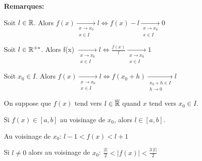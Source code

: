 \documentclass[12pt,twoside,a4paper]{article}
\begin{document}
		\begin{flushleft}
			\textbf{Remarques:}
			\begin{liste}
				\item Soit $l\in\mathbb{R}$. Alors $f(x) \mathop{\longrightarrow}\limits_{\substack{x\rightarrow x_0\\x\in I}} l \iff f(x) -l \mathop{\longrightarrow}\limits_{\substack{x\rightarrow x_0\\x\in I}} 0$
				\item Soit $l\in\mathbb{R}^{+*}$. Alors f(x) $\mathop{\longrightarrow}\limits_{\substack{x\rightarrow x_0\\x\in I}} l \iff \frac{f(x)}{l}\mathop{\longrightarrow}\limits_{\substack{x\rightarrow x_0\\x\in I}} 1$
				\item Soit $x_0\in I$. Alors $f(x)\mathop{\longrightarrow}\limits_{\substack{x\rightarrow x_0\\x\in I}} l \iff f(x_0+h)\mathop{\longrightarrow}\limits_{\substack{x_0+h\in I\\h\rightarrow 0}} l$
			\end{liste}
		\end{flushleft}
		\begin{prop}
			On suppose que $f(x)$ tend vers $l\in\overline{\mathbb{R}}$ quand $x$ tend vers $x_0\in I$.
			\begin{liste}
				\item Si $f(x)\in [a,b]$ au voisinage de $x_0$, alors $l\in [a,b]$.
				\item Au voisinage de $x_0$: $l-1<f(x)<l+1$
				\item Si $l\neq 0$ alors au voisinage de $x_0$: $\frac{|l|}{2}<\left| f(x) \right| <\frac{3\,|l|}{2}$
			\end{liste}
		\end{prop}
\end{document}
